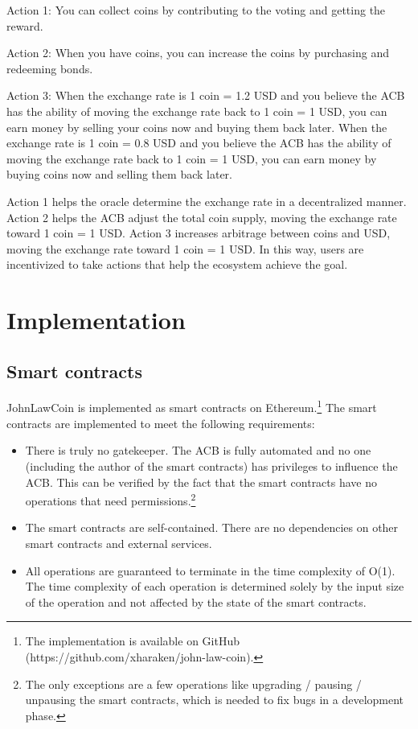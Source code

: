 \documentclass[dvipdfmx,a4paper]{article}
\begin{document}
\begin{description}
\item{Action 1}: You can collect coins by contributing to the voting and getting the reward.
\item{Action 2}: When you have coins, you can increase the coins by purchasing and redeeming bonds.
\item{Action 3}: When the exchange rate is 1 coin = 1.2 USD and you believe the ACB has the ability of moving the exchange rate back to 1 coin = 1 USD, you can earn money by selling your coins now and buying them back later. When the exchange rate is 1 coin = 0.8 USD and you believe the ACB has the ability of moving the exchange rate back to 1 coin = 1 USD, you can earn money by buying coins now and selling them back later.
\end{description}

Action 1 helps the oracle determine the exchange rate in a decentralized manner. Action 2 helps the ACB adjust the total coin supply, moving the exchange rate toward 1 coin = 1 USD. Action 3 increases arbitrage between coins and USD, moving the exchange rate toward 1 coin = 1 USD. In this way, users are incentivized to take actions that help the ecosystem achieve the goal.

\section{Implementation}

\subsection{Smart contracts}

JohnLawCoin is implemented as smart contracts on Ethereum.\footnote{The implementation is available on GitHub (https://github.com/xharaken/john-law-coin).} The smart contracts are implemented to meet the following requirements:

\begin{itemize}
\item There is truly no gatekeeper. The ACB is fully automated and no one (including the author of the smart contracts) has privileges to influence the ACB. This can be verified by the fact that the smart contracts have no operations that need permissions.\footnote{The only exceptions are a few operations like upgrading / pausing / unpausing the smart contracts, which is needed to fix bugs in a development phase.}
\item The smart contracts are self-contained. There are no dependencies on other smart contracts and external services.
\item All operations are guaranteed to terminate in the time complexity of O(1). The time complexity of each operation is determined solely by the input size of the operation and not affected by the state of the smart contracts.
\end{itemize}
\end{document}
